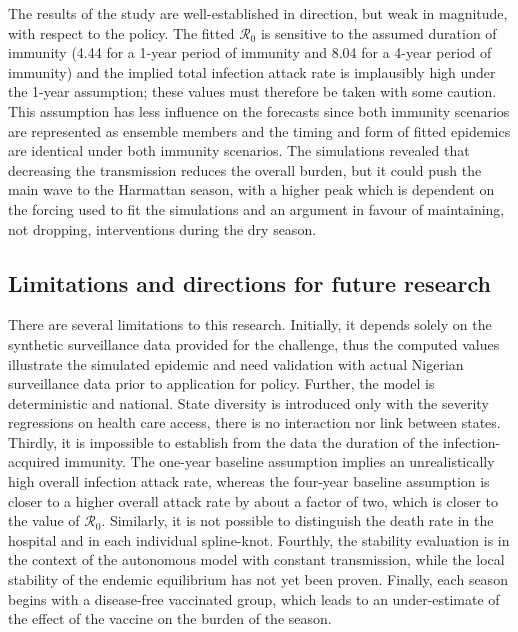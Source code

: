 \documentclass[12pt,a4paper]{article}
\theoremstyle{definition}
\theoremstyle{remark}
\begin{document}
The results of the study are well-established in direction, but weak in magnitude, with respect to the policy. The fitted $\mathcal{R}_0$ is sensitive to the assumed duration of immunity (4.44 for a 1-year period of immunity and 8.04 for a 4-year period of immunity) and the implied total infection attack rate is implausibly high under the 1-year assumption; these values must therefore be taken with some caution. This assumption has less influence on the forecasts since both immunity scenarios are represented as ensemble members and the timing and form of fitted epidemics are identical under both immunity scenarios. The simulations revealed that decreasing the transmission reduces the overall burden, but it could push the main wave to the Harmattan season, with a higher peak which is dependent on the forcing used to fit the simulations and an argument in favour of maintaining, not dropping, interventions during the dry season.


\subsection{Limitations and directions for future research}\label{sec:limitations}

There are several limitations to this research. Initially, it depends solely on the synthetic surveillance data provided for the challenge, thus the computed values illustrate the simulated epidemic and need validation with actual Nigerian surveillance data prior to application for policy. Further, the model is deterministic and national. State diversity is introduced only with the severity regressions on health care access, there is no interaction nor link between states. Thirdly, it is impossible to establish from the data the duration of the infection-acquired immunity. The one-year baseline assumption implies an unrealistically high overall infection attack rate, whereas the four-year baseline assumption is closer to a higher overall attack rate by about a factor of two, which is closer to the value of $\mathcal{R}_0$. Similarly, it is not possible to distinguish the death rate in the hospital and in each individual spline-knot. Fourthly, the stability evaluation is in the context of the autonomous model with constant transmission, while the local stability of the endemic equilibrium has not yet been proven. Finally, each season begins with a disease-free vaccinated group, which leads to an under-estimate of the effect of the vaccine on the burden of the season.
\end{document}
